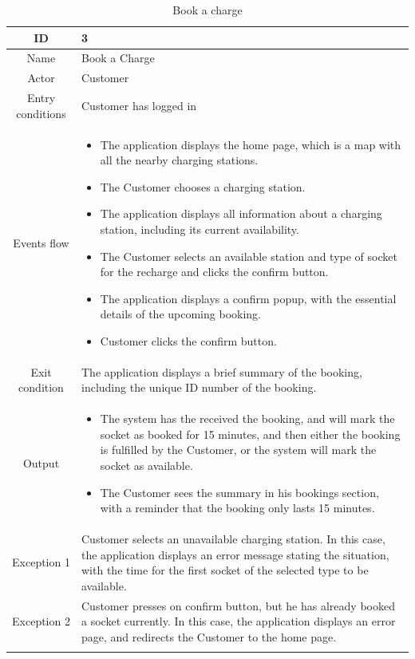 \begin{longtable}{|c| p{10cm}|}
    \hline ID        & 3\\
    \hline
    Name     & Book a Charge \\
    \hline
    Actor            & Customer\\
    \hline
    Entry conditions & Customer has logged in \\
    \hline
    Events flow      & \begin{itemize}[nosep,after=\strut]
        \item The application displays the home page, which is a map with all the nearby charging stations.
        \item The Customer chooses a charging station.
        \item The application displays all information about a charging station, including its current availability.
        \item The Customer selects an available station and type of socket for the recharge and clicks the confirm button.
        \item The application displays a confirm popup, with the essential details of the upcoming booking.
        \item Customer clicks the confirm button.
    \end{itemize}\\
    \hline
    Exit condition   & The application displays a brief summary of the booking, including the unique ID number of the booking.\\
    \hline
    Output           & \begin{itemize}
        \item   The system has the received the booking, and will mark the socket as booked for 15 minutes, and then either the booking is fulfilled by the Customer, or the system will mark the socket as available.
        \item   The Customer sees the summary in his bookings section, with a reminder that the booking only lasts 15 minutes.
    \end{itemize}\\
    \hline
    \hline
    Exception 1      &  Customer selects an unavailable charging station. In this case, the application displays an error message stating the situation, with the time for the first socket of the selected type to be available. \\
    \hline
    Exception 2      & Customer presses on confirm button, but he has already booked a socket currently. In this case, the application displays an error page, and redirects the Customer to the home page.       \\
    \hline
    \caption{Book a charge}\\
\end{longtable}
